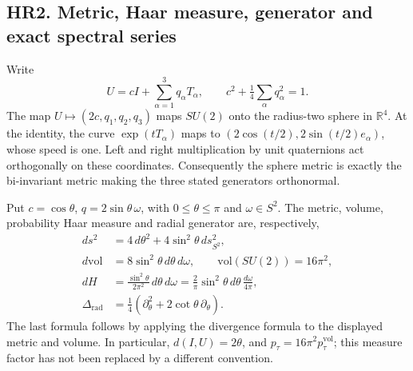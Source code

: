 \documentclass[11pt]{article}
\begin{document}
\subsection*{HR2. Metric, Haar measure, generator and exact spectral series}

Write
\[
 U=cI+\sum_{\alpha=1}^3q_\alpha T_\alpha,
 \qquad c^2+\tfrac14\sum_\alpha q_\alpha^2=1.
\]
The map \(U\mapsto(2c,q_1,q_2,q_3)\) maps \(SU(2)\) onto the
radius-two sphere in \(\mathbb R^4\). At the identity, the curve
\(\exp(tT_\alpha)\) maps to
\((2\cos(t/2),2\sin(t/2)e_\alpha)\), whose speed is one.
Left and right multiplication by unit quaternions act orthogonally on
these coordinates. Consequently the sphere metric is exactly the
bi-invariant metric making the three stated generators orthonormal.

Put \(c=\cos\theta\), \(q=2\sin\theta\,\omega\), with
\(0\le\theta\le\pi\) and \(\omega\in S^2\). The metric, volume,
probability Haar measure and radial generator are, respectively,
\[
 \begin{aligned}
 ds^2&=4\,d\theta^2+4\sin^2\theta\,ds_{S^2}^2,\\
 d\mathrm{vol}&=8\sin^2\theta\,d\theta\,d\omega,
 \qquad \mathrm{vol}(SU(2))=16\pi^2,\\
 dH&=\frac{\sin^2\theta}{2\pi^2}\,d\theta\,d\omega
   =\frac2\pi\sin^2\theta\,d\theta\,\frac{d\omega}{4\pi},\\
 \Delta_{\mathrm{rad}}&=\frac14
   (\partial_\theta^2+2\cot\theta\,\partial_\theta).
 \end{aligned}                                                   \tag{HR2}
\]
The last formula follows by applying the divergence formula to the
displayed metric and volume. In particular, \(d(I,U)=2\theta\), and
\(p_\tau=16\pi^2p_\tau^{\mathrm{vol}}\); this measure factor has not
been replaced by a different convention.
\end{document}

